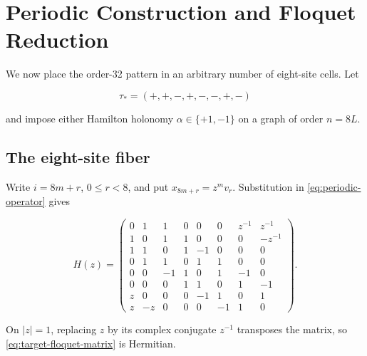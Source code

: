 \section{Periodic Construction and Floquet Reduction}\label{sec:periodic-construction}

We now place the order-32 pattern in an arbitrary number of eight-site cells.
Let

\begin{equation}
\label{eq:target-triangle-word}
\tau_*=(+,+,-,+,-,-,+,-)
\end{equation}

and impose either Hamilton holonomy \(\alpha \in \{+1,-1\}\) on a graph of order
\(n=8L\).

\subsection{The eight-site fiber}

Write \(i=8m+r\), \(0\leq r<8\), and put \(x_{8m+r}=z^m v_r\). Substitution in \eqref{eq:periodic-operator}
gives

\begin{equation}
\label{eq:target-floquet-matrix}
H(z)=\begin{pmatrix}
0 & 1 & 1 & 0 & 0 & 0 & z^{-1} & z^{-1} \\
1 & 0 & 1 & 1 & 0 & 0 & 0 & -z^{-1} \\
1 & 1 & 0 & 1 & -1 & 0 & 0 & 0 \\
0 & 1 & 1 & 0 & 1 & 1 & 0 & 0 \\
0 & 0 & -1 & 1 & 0 & 1 & -1 & 0 \\
0 & 0 & 0 & 1 & 1 & 0 & 1 & -1 \\
z & 0 & 0 & 0 & -1 & 1 & 0 & 1 \\
z & -z & 0 & 0 & 0 & -1 & 1 & 0
\end{pmatrix}.
\end{equation}

On \(\lvert z\rvert=1\), replacing \(z\) by its complex conjugate \(z^{-1}\) transposes the
matrix, so \eqref{eq:target-floquet-matrix} is Hermitian.

